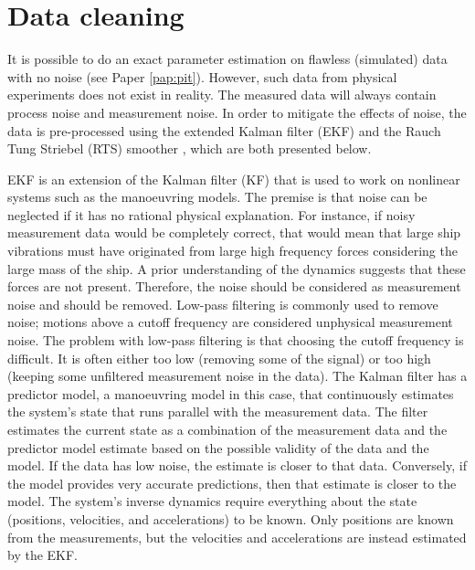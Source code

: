 \section{Data cleaning}
\label{sec:datacleaning}
It is possible to do an exact parameter estimation on flawless (simulated) data with no noise (see Paper \ref{pap:pit}). However, such data from physical experiments does not exist in reality. The measured data will always contain process noise and measurement noise. In order to mitigate the effects of noise, the data is pre-processed using the extended Kalman filter (EKF) \cite{brownIntroductionRandomSignals1997} and the Rauch Tung Striebel (RTS) smoother \cite{rauchMaximumLikelihoodEstimates1965}, which are both presented below.

EKF is an extension of the Kalman filter (KF) that is used to work on nonlinear systems such as the manoeuvring models. The premise is that noise can be neglected if it has no rational physical explanation. For instance, if noisy measurement data would be  completely correct, that would mean that large ship vibrations must have originated from large high frequency forces considering the large mass of the ship. A prior understanding of the dynamics suggests that these forces are not present. Therefore, the noise should be considered as measurement noise and should be removed. Low-pass filtering is commonly used to remove noise; motions above a cutoff frequency are considered unphysical measurement noise. The problem with low-pass filtering is that choosing the cutoff frequency is difficult. It is often  either too low (removing some of the signal) or too high (keeping some unfiltered measurement noise in the data). The Kalman filter has a predictor model, a manoeuvring model in this case, that continuously estimates the system’s state that runs parallel with the measurement data. The filter estimates the current state as a combination of the measurement data and the predictor model estimate based on the possible validity of the data and the model. If the data has low noise, the estimate is closer to that data. Conversely, if the model provides very accurate predictions, then that estimate is closer to the model.
The system’s inverse dynamics require everything about the state (positions, velocities, and accelerations) to be known. Only positions are known from the measurements, but the velocities and accelerations are instead estimated by the EKF.

